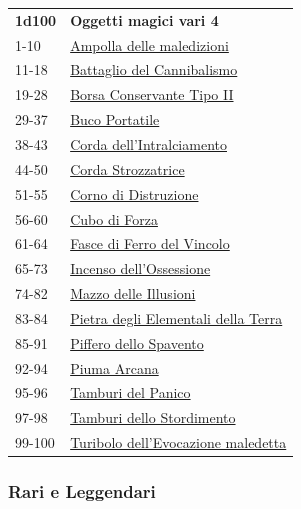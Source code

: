 \begin{multicols}{2}
{{\small\begin{tabularx}{0.45\textwidth}{lX}
\textbf{1d100} & \textbf{Oggetti magici vari 4}\\
1-10 & \hyperlink{Ampolladellemaledizioni}{Ampolla delle maledizioni}\\
11-18 & \hyperlink{BattagliodelCannibalismo}{Battaglio del Cannibalismo}\\
19-28 & \hyperlink{BorsaConservanteTipoII}{Borsa Conservante Tipo II}\\
29-37 & \hyperlink{BucoPortatile}{Buco Portatile}\\
38-43 & \hyperlink{Cordadell'Intralciamento}{Corda dell'Intralciamento}\\
44-50 & \hyperlink{CordaStrozzatrice}{Corda Strozzatrice}\\
51-55 & \hyperlink{CornodiDistruzione}{Corno di Distruzione}\\
56-60 & \hyperlink{CubodiForza}{Cubo di Forza}\\
61-64 & \hyperlink{FascediFerrodelVincolo}{Fasce di Ferro del Vincolo}\\
65-73 & \hyperlink{Incensodell'Ossessione}{Incenso dell'Ossessione}\\
74-82 & \hyperlink{MazzodelleIllusioni}{Mazzo delle Illusioni}\\
83-84 & \hyperlink{PietradegliElementalidellaTerra}{Pietra degli Elementali della Terra}\\
85-91 & \hyperlink{PifferodelloSpavento}{Piffero dello Spavento}\\
92-94 & \hyperlink{PiumaArcana}{Piuma Arcana}\\
95-96 & \hyperlink{TamburidelPanico}{Tamburi del Panico}\\
97-98 & \hyperlink{TamburidelloStordimento}{Tamburi dello Stordimento}\\
99-100 & \hyperlink{Turibolodell'Evocazionemaledetta}{Turibolo dell'Evocazione maledetta}
\end{tabularx}}


\subsubsection{Rari e Leggendari}\hypertarget{Rari e Leggendari}{}

}
\end{multicols}
